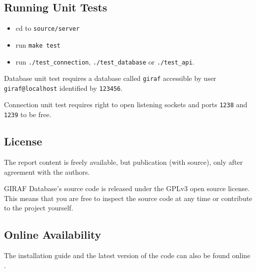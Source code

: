 \subsection{Running Unit Tests}
\begin{itemize}
\item cd to \lstinline|source/server|
\item run \lstinline|make test|
\item run \lstinline|./test_connection|, \lstinline|./test_database| or 
\lstinline|./test_api|.
\end{itemize}
Database unit test requires a database called \lstinline|giraf| accessible by user \lstinline|giraf@localhost| identified by \lstinline|123456|.

Connection unit test requires right to open listening sockets and ports \lstinline|1238| and \lstinline|1239| to be free.

\subsection{License}
The report content is freely available, but publication (with source), only after agreement with the authors.

GIRAF Database's source code is released under the GPLv3 \cite{GNUlicense} open source license. This means that you are free to inspect the source code at any time or contribute to the project yourself.

\subsection*{Online Availability} The installation guide and the latest version of the code can also be found online \cite{install}.